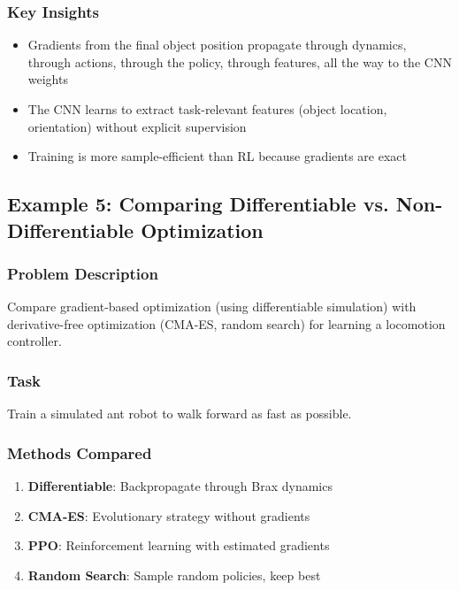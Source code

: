 \subsubsection{Key Insights}

\begin{itemize}
    \item Gradients from the final object position propagate through dynamics, through actions, through the policy, through features, all the way to the CNN weights
    \item The CNN learns to extract task-relevant features (object location, orientation) without explicit supervision
    \item Training is more sample-efficient than RL because gradients are exact
\end{itemize}

\subsection{Example 5: Comparing Differentiable vs. Non-Differentiable Optimization}

\subsubsection{Problem Description}

Compare gradient-based optimization (using differentiable simulation) with derivative-free optimization (CMA-ES, random search) for learning a locomotion controller.

\subsubsection{Task}

Train a simulated ant robot to walk forward as fast as possible.

\subsubsection{Methods Compared}

\begin{enumerate}
    \item \textbf{Differentiable}: Backpropagate through Brax dynamics
    \item \textbf{CMA-ES}: Evolutionary strategy without gradients
    \item \textbf{PPO}: Reinforcement learning with estimated gradients
    \item \textbf{Random Search}: Sample random policies, keep best
\end{enumerate}

